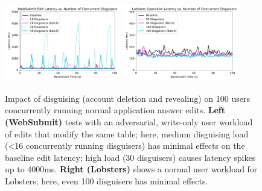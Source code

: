 \begin{figure}[t!]
    \centering
        \includegraphics[width=0.45\textwidth]{figs/websubmit_concurrent_results_20lec_100users}
        \includegraphics[width=0.45\textwidth]{figs/lobsters_concurrent_results}
    \caption{Impact of disguising (account deletion and revealing) on 100 users concurrently running
    normal application answer edits. \textbf{Left (WebSubmit)} tests with an adversarial,
    write-only user workload of edits that modify the same table; here, medium disguising load (<16
    concurrently running disguisers) has minimal effects on the baseline edit latency; high load (30
    disguisers) causes latency spikes up to 4000ms.
    \textbf{Right (Lobsters)} shows a normal user workload for Lobsters; here, even 100 disguisers
    has minimal effects.
    } 
    \label{fig:concurrent}
\end{figure}
